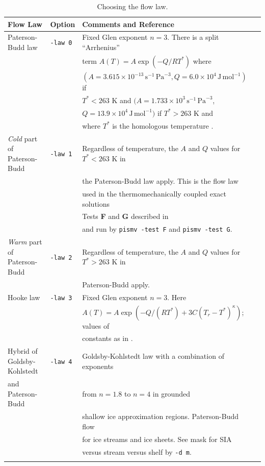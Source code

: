 \documentclass[11pt,final]{amsart}
\renewcommand{\t}[1]{\texttt{#1}}
\begin{document}
\begin{table}[ht]
\caption{Choosing the flow law.}\label{tab:flowlaw}
\small
\begin{tabular}{@{}llll}\hline
\textbf{Flow Law} & \textbf{Option} & \textbf{Comments and Reference} \\ \hline
Paterson-Budd law   &  \t{-law 0} &   Fixed Glen exponent $n=3$.  There is a split ``Arrhenius'' \\
  & & term $A(T) = A \exp(-Q/RT^*)$ where \\
  & & $(A = 3.615 \times 10^{-13}\, \text{s}^{-1}\, \text{Pa}^{-3}, Q = 6.0 \times 10^4\, \text{J}\, \text{mol}^{-1})$ if \\
  & & $T^* < 263$ K and $(A = 1.733 \times 10^{3}\, \text{s}^{-1}\, \text{Pa}^{-3}$, \\
  & & $Q = 13.9 \times 10^4\, \text{J}\, \text{mol}^{-1})$ if $T^* > 263$ K and \\
  & & where $T^*$ is the homologous temperature \cite{PatersonBudd}.  \\
\emph{Cold} part of Paterson-Budd    &  \t{-law 1} &   Regardless of temperature, the $A$ and $Q$ values for $T^*<263$ K in \\
  & & the Paterson-Budd law apply.  This is the flow law \\
  & & used in the thermomechanically coupled exact solutions \\
  & & Tests \textbf{F} and \textbf{G} described in \cite{BBL,BB} \\
  & & and run by \verb|pismv -test F| and \verb|pismv -test G|.  \\
\emph{Warm} part of Paterson-Budd     &  \t{-law 2} & Regardless of temperature, the $A$ and $Q$ values for $T^*>263$ K in \\
  & &  Paterson-Budd apply.    \\
Hooke law   &  \t{-law 3} &  Fixed Glen exponent $n=3$.  Here \\
  & & $A(T) = A \exp(-Q/(RT^*) + 3C (T_r - T^*)^\kappa)$; values of \\
  & & constants as in \cite{Hooke,PayneBaldwin}.   \\
Hybrid of Goldsby-Kohlstedt &  \t{-law 4} &     Goldsby-Kohlstedt law with a combination of exponents  \\
  \qquad and Paterson-Budd & & from $n=1.8$ to $n=4$ \cite{GoldsbyKohlstedt} in grounded \\
  & & shallow ice approximation regions.  Paterson-Budd flow \\
  & & for ice streams and ice sheets. See mask for SIA \\
  & & versus stream versus shelf by \verb|-d m|. \\
\hline
\normalsize	
\end{tabular}
\end{table}
\end{document}
